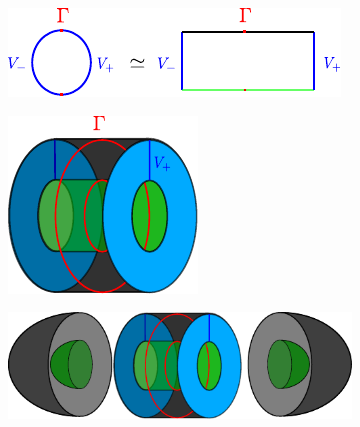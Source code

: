 \begin{figure}[h!]
    \begin{subfigure}[t]{.6\linewidth}
        \includegraphics[trim=-.5cm -.5cm -.5cm -.5cm, width=\linewidth]{images/convex_decomposition_of_s1.pdf}
    \end{subfigure}\hspace*{.1\linewidth}
    \begin{subfigure}[t]{.3\linewidth}
        \includegraphics[trim=-.5cm -.5cm -.5cm -.5cm, width=\linewidth]{images/v_times_s1.pdf}
    \end{subfigure}
    \begin{subfigure}{.9\linewidth}
        \includegraphics[trim=-.5cm -.5cm -.5cm -.5cm, width=\linewidth]{images/v_times_s1_with_caps.pdf}

\end{subfigure}
\end{figure}

